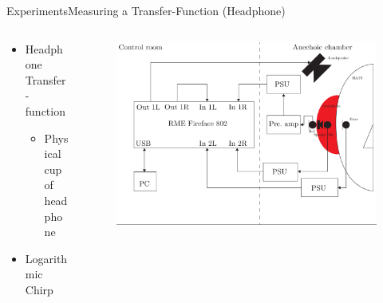 \begin{frame}{Experiments}{Measuring a Transfer-Function (Headphone)}		
	\begin{columns}
		\begin{column}{0.3\textwidth}
			\begin{itemize}
				\item Headphone Transfer-function
				\begin{itemize}
					\item Physical cup of headphone
				\end{itemize}
				\item{Logarithmic Chirp}
			\end{itemize}
		\end{column}
		\begin{column}{0.7\textwidth} 
			\begin{figure}[h]
				\includegraphics[width=1\textwidth]{figures/AngleOfIncidenceSetup.pdf}
			\end{figure}
		\end{column}
	\end{columns}
\end{frame}

